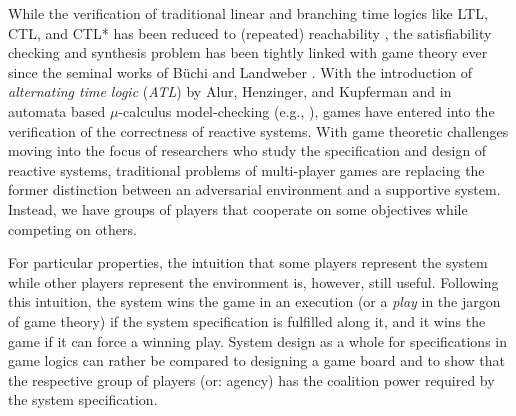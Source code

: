 \documentclass{llncs}
\begin{document}
While the verification of traditional linear and 
branching time logics like LTL, CTL, and CTL* \cite{Pnueli77,CE81} 
has been reduced to (repeated) reachability \cite{Holzmann97,KVW00},
the satisfiability checking and synthesis problem has been tightly linked with game theory ever since the seminal works 
of B\"uchi and Landweber \cite{BL69,BL69a}.
With the introduction of {\em alternating time logic} 
({\em ATL}) by Alur, Henzinger, and Kupferman \cite{AHK02} and in automata based $\mu$-calculus model-checking (e.g., \cite{Wilke01}), games have entered into the verification of the correctness of reactive systems.
With game theoretic challenges moving into the focus of researchers who study the specification and design of reactive systems, traditional problems of multi-player games are replacing the former distinction between an adversarial environment and a supportive system.
Instead, we have groups of players that cooperate on some objectives while competing on others.

For particular properties, the intuition that some players represent the system while 
other players represent the environment is, however, still useful.  
Following this intuition, the system wins the game in an execution 
(or a {\em play} in the jargon of game theory) 
if the system specification is fulfilled along it, and it wins the game if it can force a winning play.
System design as a whole for specifications in game logics can rather be compared to designing a game board and to show that the respective group of players (or: agency) has the coalition power required by the system specification.
\end{document}
